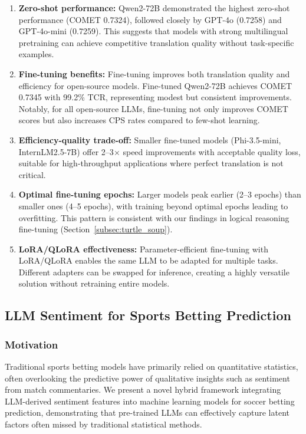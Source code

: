\begin{enumerate}[leftmargin=*]
    \item \textbf{Zero-shot performance:} Qwen2-72B demonstrated the highest zero-shot performance (COMET 0.7324), followed closely by GPT-4o (0.7258) and GPT-4o-mini (0.7259). This suggests that models with strong multilingual pretraining can achieve competitive translation quality without task-specific examples.
    
    \item \textbf{Fine-tuning benefits:} Fine-tuning improves both translation quality and efficiency for open-source models. Fine-tuned Qwen2-72B achieves COMET 0.7345 with 99.2\% TCR, representing modest but consistent improvements. Notably, for all open-source LLMs, fine-tuning not only improves COMET scores but also increases CPS rates compared to few-shot learning.
    
    \item \textbf{Efficiency-quality trade-off:} Smaller fine-tuned models (Phi-3.5-mini, InternLM2.5-7B) offer 2--3$\times$ speed improvements with acceptable quality loss, suitable for high-throughput applications where perfect translation is not critical.
    
    \item \textbf{Optimal fine-tuning epochs:} Larger models peak earlier (2--3 epochs) than smaller ones (4--5 epochs), with training beyond optimal epochs leading to overfitting. This pattern is consistent with our findings in logical reasoning fine-tuning (Section~\ref{subsec:turtle_soup}).
    
    \item \textbf{LoRA/QLoRA effectiveness:} Parameter-efficient fine-tuning with LoRA/QLoRA enables the same LLM to be adapted for multiple tasks. Different adapters can be swapped for inference, creating a highly versatile solution without retraining entire models.
\end{enumerate}

\subsection{LLM Sentiment for Sports Betting Prediction}
\label{subsec:soccer_betting}

\subsubsection{Motivation}

Traditional sports betting models have primarily relied on quantitative statistics, often overlooking the predictive power of qualitative insights such as sentiment from match commentaries. We present a novel hybrid framework integrating LLM-derived sentiment features into machine learning models for soccer betting prediction, demonstrating that pre-trained LLMs can effectively capture latent factors often missed by traditional statistical methods.

